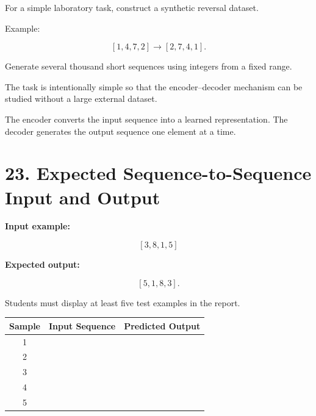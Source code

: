 \documentclass[10pt]{article}
\begin{document}
For a simple laboratory task, construct a synthetic reversal dataset.

Example:

\[
[1,4,7,2]\rightarrow[2,7,4,1].
\]

Generate several thousand short sequences using integers from a fixed range.

The task is intentionally simple so that the encoder--decoder mechanism can
be studied without a large external dataset.

\begin{center}
\end{center}

The encoder converts the input sequence into a learned representation.
The decoder generates the output sequence one element at a time.

\section*{23. Expected Sequence-to-Sequence Input and Output}

\textbf{Input example:}

\[
[3,8,1,5]
\]

\textbf{Expected output:}

\[
[5,1,8,3].
\]

Students must display at least five test examples in the report.

\begin{center}
\begin{tabular}{|c|c|c|}
\hline
Sample & Input Sequence & Predicted Output\\
\hline
1 & &\\
2 & &\\
3 & &\\
4 & &\\
5 & &\\
\hline
\end{tabular}
\end{center}
\end{document}
